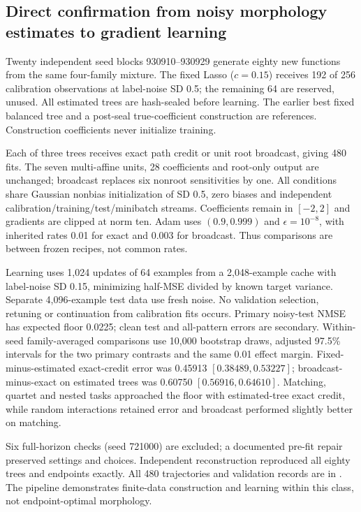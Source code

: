 \subsection{Direct confirmation from noisy morphology estimates to gradient learning}
\label{note:morphology_end_to_end}

Twenty independent seed blocks 930910--930929 generate eighty new functions from the same four-family mixture. The fixed Lasso ($c=0.15$) receives 192 of 256 calibration observations at label-noise SD 0.5; the remaining 64 are reserved, unused. All estimated trees are hash-sealed before learning. The earlier best fixed balanced tree and a post-seal true-coefficient construction are references. Construction coefficients never initialize training.

Each of three trees receives exact path credit or unit root broadcast, giving 480 fits. The seven multi-affine units, 28 coefficients and root-only output are unchanged; broadcast replaces six nonroot sensitivities by one. All conditions share Gaussian nonbias initialization of SD 0.5, zero biases and independent calibration/training/test/minibatch streams. Coefficients remain in $[-2,2]$ and gradients are clipped at norm ten. Adam uses $(0.9,0.999)$ and $\epsilon=10^{-8}$, with inherited rates 0.01 for exact and 0.003 for broadcast. Thus comparisons are between frozen recipes, not common rates.

Learning uses 1,024 updates of 64 examples from a 2,048-example cache with label-noise SD 0.15, minimizing half-MSE divided by known target variance. Separate 4,096-example test data use fresh noise. No validation selection, retuning or continuation from calibration fits occurs. Primary noisy-test NMSE has expected floor 0.0225; clean test and all-pattern errors are secondary. Within-seed family-averaged comparisons use 10,000 bootstrap draws, adjusted 97.5\% intervals for the two primary contrasts and the same 0.01 effect margin. Fixed-minus-estimated exact-credit error was 0.45913 $[0.38489,0.53227]$; broadcast-minus-exact on estimated trees was 0.60750 $[0.56916,0.64610]$. Matching, quartet and nested tasks approached the floor with estimated-tree exact credit, while random interactions retained error and broadcast performed slightly better on matching.

Six full-horizon checks (seed 721000) are excluded; a documented pre-fit repair preserved settings and choices. Independent reconstruction reproduced all eighty trees and endpoints exactly. All 480 trajectories and validation records are in . The pipeline demonstrates finite-data construction and learning within this class, not endpoint-optimal morphology.

